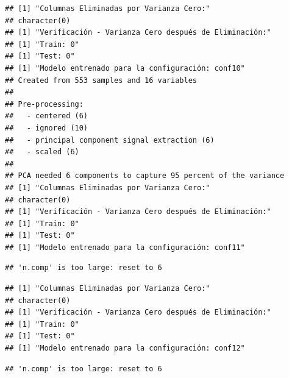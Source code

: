 \documentclass[
]{article}
\begin{document}
\begin{verbatim}
## [1] "Columnas Eliminadas por Varianza Cero:"
## character(0)
## [1] "Verificación - Varianza Cero después de Eliminación:"
## [1] "Train: 0"
## [1] "Test: 0"
## [1] "Modelo entrenado para la configuración: conf10"
## Created from 553 samples and 16 variables
## 
## Pre-processing:
##   - centered (6)
##   - ignored (10)
##   - principal component signal extraction (6)
##   - scaled (6)
## 
## PCA needed 6 components to capture 95 percent of the variance
## [1] "Columnas Eliminadas por Varianza Cero:"
## character(0)
## [1] "Verificación - Varianza Cero después de Eliminación:"
## [1] "Train: 0"
## [1] "Test: 0"
## [1] "Modelo entrenado para la configuración: conf11"
\end{verbatim}

\begin{verbatim}
## 'n.comp' is too large: reset to 6
\end{verbatim}

\begin{verbatim}
## [1] "Columnas Eliminadas por Varianza Cero:"
## character(0)
## [1] "Verificación - Varianza Cero después de Eliminación:"
## [1] "Train: 0"
## [1] "Test: 0"
## [1] "Modelo entrenado para la configuración: conf12"
\end{verbatim}

\begin{verbatim}
## 'n.comp' is too large: reset to 6
\end{verbatim}
\end{document}
